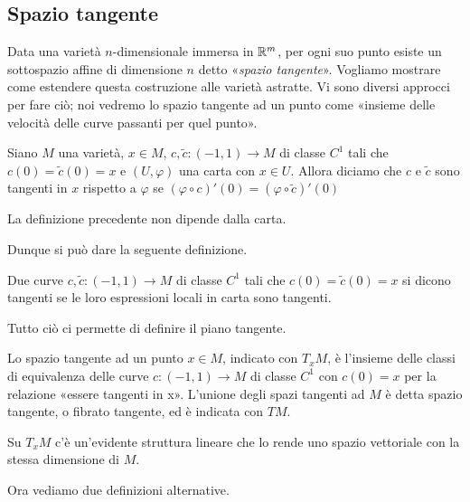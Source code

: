  \subsection{ Spazio tangente}
 
 Data una varietà $n$-dimensionale immersa in $\mathbb R^m$, per ogni suo punto esiste
 un sottospazio affine di dimensione $n$ detto «\emph{spazio tangente}». Vogliamo
 mostrare come estendere questa costruzione alle varietà astratte. Vi sono diversi
 approcci per fare ciò; noi vedremo lo spazio tangente ad un punto come «insieme delle
 velocità delle curve passanti per quel punto».
 
 \begin{definition}
  Siano $M$ una varietà, $x\in M$, $c,\tilde{c}:(-1,1)\to M$ di classe $C^1$ tali che
  $c(0)=\tilde{c}(0)=x$ e $(U,\varphi)$ una carta con $x\in U$. Allora diciamo che $c$ e
  $\tilde{c}$ sono tangenti in $x$ rispetto a $\varphi$ se $(\varphi\circ c)'(0)=(\varphi\circ\tilde{c})'(0)$
 \end{definition}

 \begin{proposition}
  La definizione precedente non dipende dalla carta.
 \end{proposition}

 Dunque si può dare la seguente definizione.
 
 \begin{definition}
  Due curve $c,\tilde{c}:(-1,1)\to M$ di classe $C^1$ tali che $c(0)=\tilde{c}(0)=x$
  si dicono tangenti se le loro espressioni locali in carta sono tangenti.
 \end{definition}

 Tutto ciò ci permette di definire il piano tangente.
 
 \begin{definition}
  Lo spazio tangente ad un punto $x\in M$, indicato con $T_xM$, è l'insieme delle classi di equivalenza delle
  curve $c:(-1,1)\to M$ di classe $C^1$ con $c(0)=x$ per la relazione «essere
  tangenti in x». L'unione degli spazi tangenti ad $M$ è detta spazio tangente, o
  fibrato tangente, ed è indicata con $TM$.
 \end{definition}
 
 \begin{remark}
  Su $T_xM$ c'è un'evidente struttura lineare che lo rende uno spazio vettoriale con la
  stessa dimensione di $M$.
 \end{remark}

 Ora vediamo due definizioni alternative.
 
